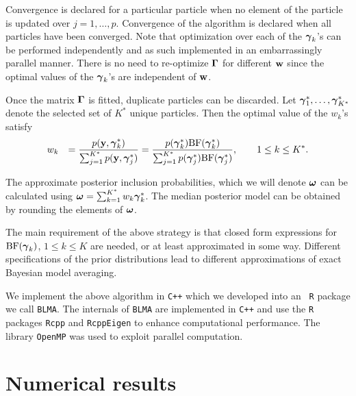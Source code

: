  Convergence is declared for a particular particle when no element of
the particle is updated over $j=1,\ldots,p$. Convergence of the algorithm is
declared when all particles have been converged. Note that optimization over
each of the ${\boldsymbol \gamma}_k$'s can be performed independently and as such
implemented in an embarrassingly parallel manner.  There is no need to
re-optimize ${\boldsymbol \Gamma}$ for different ${\bf w}$ since  the optimal values of the
${\boldsymbol \gamma}_k$'s are independent of ${\bf w}$.

Once the matrix ${\boldsymbol \Gamma}$ is fitted, duplicate particles can be discarded.  Let
${{\boldsymbol \gamma}}_1^*,\ldots,{{\boldsymbol \gamma}}_{K^*}^*$ denote the selected set of $K^*$
unique particles. Then the optimal value of the $w_k$'s satisfy
\begin{equation}
\label{eq:updateW}
\begin{array}{rl}
\displaystyle w_k 
& \displaystyle = \frac{\displaystyle p({\bf y},{\boldsymbol \gamma}_k^*)}{\sum_{j=1}^{K^*} p({\bf y},{\boldsymbol \gamma}_j^*)}
= \frac{p({\boldsymbol \gamma}_k^*)\mbox{BF}({\boldsymbol \gamma}_k^*)
}{\sum_{j=1}^{K^*}
	p({\boldsymbol \gamma}_j^*)\mbox{BF}({\boldsymbol \gamma}_j^*)
}, \qquad 1\le k\le K^*.
\end{array}
\end{equation}

\noindent The approximate posterior inclusion probabilities, which we will
denote ${\boldsymbol \omega}$ can be calculated using ${\boldsymbol \omega} = \sum_{k=1}^{K^*} w_k
{\boldsymbol \gamma}_k^*$.  The median posterior model can be obtained by rounding the
elements of ${\boldsymbol \omega}$.

The main requirement of the above strategy is that closed form expressions for
$\mbox{BF}({\boldsymbol \gamma}_k)$, $1\le k\le K$ are needed, or at least approximated in
some way.  Different specifications of the prior distributions lead to
different approximations of exact Bayesian model averaging.

We implement the above algorithm in {\tt C++} which we developed into an {\tt
R} package we call  {\tt BLMA}.  The internals of {\tt BLMA} are implemented in
{\tt C++} and use the {\tt R} packages \texttt{Rcpp} and \texttt{RcppEigen} to
enhance computational performance. The library {\tt OpenMP} was used to exploit
parallel computation.

\section{Numerical results}
\label{sec:numerical}

